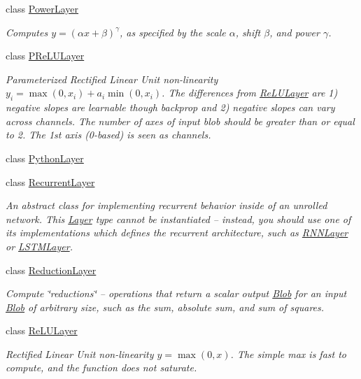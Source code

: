 \begin{DoxyCompactItemize}
class \hyperlink{classcaffe_1_1PowerLayer}{Power\+Layer}
\begin{DoxyCompactList}\small\item\em Computes $ y = (\alpha x + \beta) ^ \gamma $, as specified by the scale $ \alpha $, shift $ \beta $, and power $ \gamma $. \end{DoxyCompactList}\item 
class \hyperlink{classcaffe_1_1PReLULayer}{P\+Re\+L\+U\+Layer}
\begin{DoxyCompactList}\small\item\em Parameterized Rectified Linear Unit non-\/linearity $ y_i = \max(0, x_i) + a_i \min(0, x_i) $. The differences from \hyperlink{classcaffe_1_1ReLULayer}{Re\+L\+U\+Layer} are 1) negative slopes are learnable though backprop and 2) negative slopes can vary across channels. The number of axes of input blob should be greater than or equal to 2. The 1st axis (0-\/based) is seen as channels. \end{DoxyCompactList}\item 
class \hyperlink{classcaffe_1_1PythonLayer}{Python\+Layer}
\item 
class \hyperlink{classcaffe_1_1RecurrentLayer}{Recurrent\+Layer}
\begin{DoxyCompactList}\small\item\em An abstract class for implementing recurrent behavior inside of an unrolled network. This \hyperlink{classcaffe_1_1Layer}{Layer} type cannot be instantiated -- instead, you should use one of its implementations which defines the recurrent architecture, such as \hyperlink{classcaffe_1_1RNNLayer}{R\+N\+N\+Layer} or \hyperlink{classcaffe_1_1LSTMLayer}{L\+S\+T\+M\+Layer}. \end{DoxyCompactList}\item 
class \hyperlink{classcaffe_1_1ReductionLayer}{Reduction\+Layer}
\begin{DoxyCompactList}\small\item\em Compute \char`\"{}reductions\char`\"{} -- operations that return a scalar output \hyperlink{classcaffe_1_1Blob}{Blob} for an input \hyperlink{classcaffe_1_1Blob}{Blob} of arbitrary size, such as the sum, absolute sum, and sum of squares. \end{DoxyCompactList}\item 
class \hyperlink{classcaffe_1_1ReLULayer}{Re\+L\+U\+Layer}
\begin{DoxyCompactList}\small\item\em Rectified Linear Unit non-\/linearity $ y = \max(0, x) $. The simple max is fast to compute, and the function does not saturate. \end{DoxyCompactList}\item 

\end{DoxyCompactItemize}

